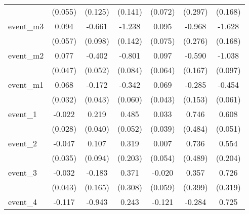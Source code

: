 {\begin{tabular}{l*{6}{c}}
            &     (0.055)         &     (0.125)         &     (0.141)         &     (0.072)         &     (0.297)         &     (0.168)         \\
[1em]
event\_m3    &       0.094         &      -0.661\sym{***}&      -1.238\sym{***}&       0.095         &      -0.968\sym{***}&      -1.628\sym{***}\\
            &     (0.057)         &     (0.098)         &     (0.142)         &     (0.075)         &     (0.276)         &     (0.168)         \\
[1em]
event\_m2    &       0.077         &      -0.402\sym{***}&      -0.801\sym{***}&       0.097         &      -0.590\sym{***}&      -1.038\sym{***}\\
            &     (0.047)         &     (0.052)         &     (0.084)         &     (0.064)         &     (0.167)         &     (0.097)         \\
[1em]
event\_m1    &       0.068\sym{*}  &      -0.172\sym{***}&      -0.342\sym{***}&       0.069         &      -0.285         &      -0.454\sym{***}\\
            &     (0.032)         &     (0.043)         &     (0.060)         &     (0.043)         &     (0.153)         &     (0.061)         \\
[1em]
event\_1     &      -0.022         &       0.219\sym{***}&       0.485\sym{***}&       0.033         &       0.746         &       0.608\sym{***}\\
            &     (0.028)         &     (0.040)         &     (0.052)         &     (0.039)         &     (0.484)         &     (0.051)         \\
[1em]
event\_2     &      -0.047         &       0.107         &       0.319         &       0.007         &       0.736         &       0.554\sym{**} \\
            &     (0.035)         &     (0.094)         &     (0.203)         &     (0.054)         &     (0.489)         &     (0.204)         \\
[1em]
event\_3     &      -0.032         &      -0.183         &       0.371         &      -0.020         &       0.357         &       0.726\sym{*}  \\
            &     (0.043)         &     (0.165)         &     (0.308)         &     (0.059)         &     (0.399)         &     (0.319)         \\
[1em]
event\_4     &      -0.117         &      -0.943\sym{**} &       0.243         &      -0.121         &      -0.284         &       0.725\sym{*}  \\

\end{tabular}}
